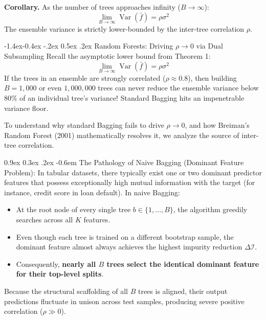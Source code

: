 \documentclass[11pt,a4paper]{article}
\makeatletter
\renewcommand\subsection{\@startsection{subsection}{2}{\z@}%
                                     {-1.4ex\@plus -0.4ex \@minus -.2ex}%
                                     {0.5ex \@plus .2ex}%
                                     {\normalfont\normalsize\bfseries}}
\renewcommand\paragraph{\@startsection{paragraph}{4}{\z@}%
                                     {0.9ex \@plus0.3ex \@minus.2ex}%
                                     {-0.6em}%
                                     {\normalfont\normalsize\bfseries}}
\newcommand{\Var}{\operatorname{Var}}
\makeatother
\begin{document}
\textbf{Corollary.} As the number of trees approaches infinity ($B \to \infty$):
\begin{equation}
    \lim_{B \to \infty} \Var(\bar{f}) = \rho \sigma^2
\end{equation}
The ensemble variance is strictly lower-bounded by the inter-tree correlation $\rho$.

\subsection{Random Forests: Driving \texorpdfstring{$\rho \to 0$}{rho -> 0} via Dual Subsampling}
Recall the asymptotic lower bound from Theorem 1:
\begin{equation}
    \lim_{B \to \infty} \Var(\bar{f}) = \rho \sigma^2
\end{equation}
If the trees in an ensemble are strongly correlated ($\rho \approx 0.8$), then building $B = 1{,}000$ or even $1{,}000{,}000$ trees can never reduce the ensemble variance below $80\%$ of an individual tree's variance! Standard Bagging hits an impenetrable variance floor. 

To understand why standard Bagging fails to drive $\rho \to 0$, and how Breiman's Random Forest (2001) mathematically resolves it, we analyze the source of inter-tree correlation.

\paragraph{The Pathology of Naive Bagging (Dominant Feature Problem):}
In tabular datasets, there typically exist one or two dominant predictor features that possess exceptionally high mutual information with the target (for instance, credit score in loan default). In naive Bagging:
\begin{itemize}
    \item At the root node of every single tree $b \in \{1, \dots, B\}$, the algorithm greedily searches across all $K$ features.
    \item Even though each tree is trained on a different bootstrap sample, the dominant feature almost always achieves the highest impurity reduction $\Delta \mathcal{I}$.
    \item Consequently, \textbf{nearly all $B$ trees select the identical dominant feature for their top-level splits}.
\end{itemize}
Because the structural scaffolding of all $B$ trees is aligned, their output predictions fluctuate in unison across test samples, producing severe positive correlation ($\rho \gg 0$).
\end{document}
